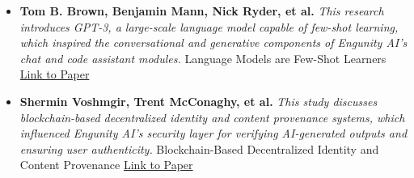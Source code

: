 \begin{itemize}
    \item \textbf{Tom B. Brown, Benjamin Mann, Nick Ryder, et al.} \textit{This research introduces GPT-3, a large-scale language model capable of few-shot learning, which inspired the conversational and generative components of Engunity AI’s chat and code assistant modules.}  
    Language Models are Few-Shot Learners  
    \href{https://arxiv.org/pdf/2005.14165}{Link to Paper}

    \item \textbf{Shermin Voshmgir, Trent McConaghy, et al.} \textit{This study discusses blockchain-based decentralized identity and content provenance systems, which influenced Engunity AI’s security layer for verifying AI-generated outputs and ensuring user authenticity.}  
    Blockchain-Based Decentralized Identity and Content Provenance  
    \href{https://link.springer.com/chapter/10.1007/978-3-030-95142-3_5}{Link to Paper}
\end{itemize}




